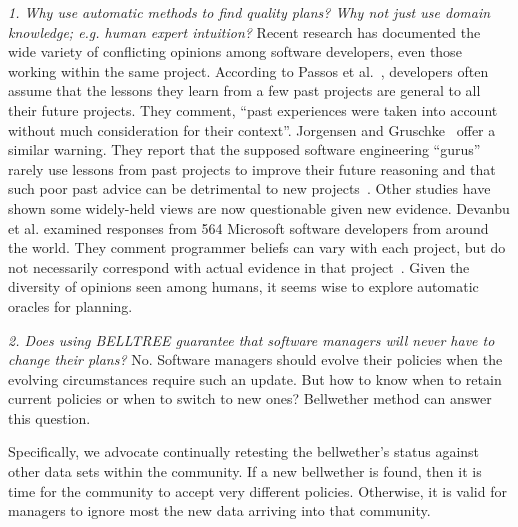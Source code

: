 \documentclass[smallextended]{svjour3}       %
\begin{document}
\textit{1. Why use automatic methods to find quality plans? Why not just use domain knowledge; e.g. human expert intuition?} Recent research has documented the wide variety of conflicting opinions among software developers, even those working within the same project. According to Passos et al.~\cite{passos11}, developers often assume that the lessons they learn from a few past projects are general to all their future projects. They comment, ``past experiences were taken into account without
much consideration for their context''. Jorgensen and Gruschke~\cite{jorgensen09} offer a similar warning. They report that the supposed software engineering ``gurus'' rarely use lessons from past projects to improve their future reasoning and that such poor past advice can be detrimental to new projects~\cite{jorgensen09}. Other studies have shown some widely-held views are now questionable given new evidence. Devanbu et al. examined responses from 564 Microsoft software developers from around the world. They comment programmer beliefs can vary with each project, but do not necessarily correspond with actual evidence in that project~\cite{prem16}. Given the diversity of opinions seen among humans, it seems wise to explore automatic oracles for planning.

\textit{2. Does using BELLTREE guarantee that software managers will never have to change their plans?} No. Software managers should evolve their policies when the evolving circumstances require such an update. But how to know when to retain current policies or when to switch to new ones? Bellwether method can answer this question.

Specifically, we advocate continually retesting the bellwether's status against other data sets within the community. If a new bellwether is found, then it is time for the community to accept very different policies. Otherwise, it is valid for managers to ignore most the new data arriving into that community.
\end{document}
